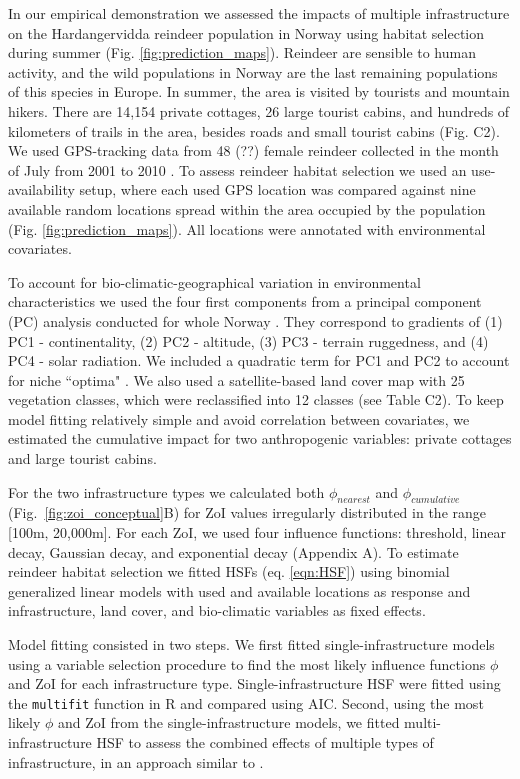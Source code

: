 \documentclass[titlepage]{article}
\begin{document}
In our empirical demonstration we assessed the impacts of multiple infrastructure on the Hardangervidda reindeer population in Norway using habitat selection during summer (Fig. \ref{fig:prediction_maps}). Reindeer are sensible to human activity, and the wild populations in Norway are the last remaining populations of this species in Europe. In summer, the area is visited by tourists and mountain hikers. There are 14,154 private cottages, 26 large tourist cabins, and hundreds of kilometers of trails in the area, besides roads and small tourist cabins (Fig. C2). We used GPS-tracking data from 48 (??) female reindeer collected in the month of July from 2001 to 2010 \citep[see][for further details]{panzacchi_searching_2015}. To assess reindeer habitat selection we used an use-availability setup, where each used GPS location was compared against nine available random locations spread within the area occupied by the population (Fig. \ref{fig:prediction_maps}). All locations were annotated with environmental covariates.

To account for bio-climatic-geographical variation in environmental characteristics we used the four first components from a principal component (PC) analysis conducted for whole Norway \citep{bakkestuen_step-less_2008}. They correspond to gradients of (1) PC1 - continentality, (2) PC2 - altitude, (3) PC3 - terrain ruggedness, and (4) PC4 - solar radiation. We included a quadratic term for PC1 and PC2 to account for niche ``optima" \citep[\textit{sensu}][]{panzacchi_searching_2015}. We also used a satellite-based land cover map with 25 vegetation classes, which were reclassified into 12 classes (see Table C2). To keep model fitting relatively simple and avoid correlation between covariates, we estimated the cumulative impact for two anthropogenic variables: private cottages and large tourist cabins.

For the two infrastructure types we calculated both $\phi_{nearest}$ and $\phi_{cumulative}$ (Fig.~\ref{fig:zoi_conceptual}B) for ZoI values irregularly distributed in the range [100m, 20,000m]. For each ZoI, we used four influence functions: threshold, linear decay, Gaussian decay, and exponential decay (Appendix A). To estimate reindeer habitat selection we fitted HSFs (eq. \ref{eqn:HSF}) using binomial generalized linear models \citep{fieberg_how_2021} with used and available locations as response and infrastructure, land cover, and bio-climatic variables as fixed effects. 

Model fitting consisted in two steps. We first fitted single-infrastructure models using a variable selection procedure \citep{burnham_model_2002} to find the most likely influence functions $\phi$ and ZoI for each infrastructure type. Single-infrastructure HSF were fitted using the \verb|multifit| function in R \citep{huais_multifit_2018} and compared using AIC. Second, using the most likely $\phi$ and ZoI from the single-infrastructure models, we fitted multi-infrastructure HSF to assess the combined effects of multiple types of infrastructure, in an approach similar to \citet{laforge_process-focussed_2015}. 
\end{document}
